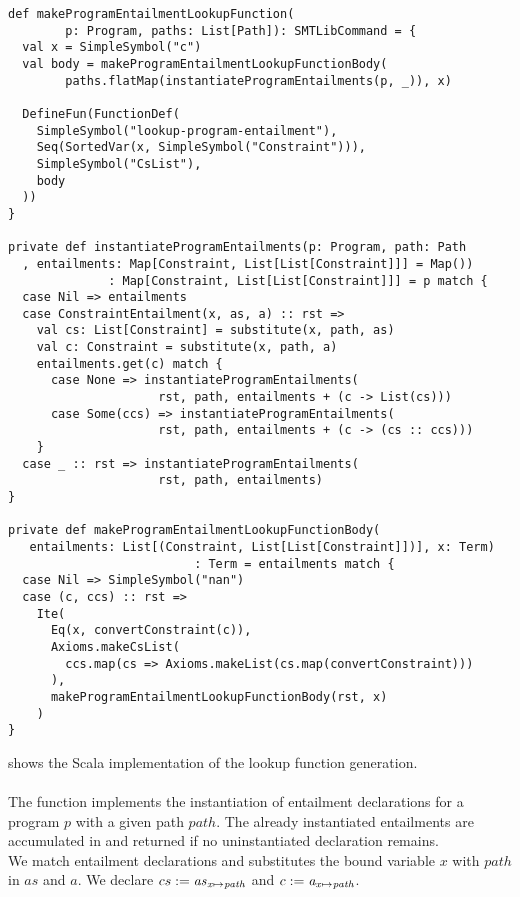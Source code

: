 \begin{lstlisting}[caption={Lookup Function Generation},label=lst:lookup,captionpos=b,frame={lines}]
def makeProgramEntailmentLookupFunction(
        p: Program, paths: List[Path]): SMTLibCommand = {
  val x = SimpleSymbol("c")
  val body = makeProgramEntailmentLookupFunctionBody(
        paths.flatMap(instantiateProgramEntailments(p, _)), x)

  DefineFun(FunctionDef(
    SimpleSymbol("lookup-program-entailment"),
    Seq(SortedVar(x, SimpleSymbol("Constraint"))),
    SimpleSymbol("CsList"),
    body
  ))
}

private def instantiateProgramEntailments(p: Program, path: Path
  , entailments: Map[Constraint, List[List[Constraint]]] = Map())
              : Map[Constraint, List[List[Constraint]]] = p match {
  case Nil => entailments
  case ConstraintEntailment(x, as, a) :: rst =>
    val cs: List[Constraint] = substitute(x, path, as)
    val c: Constraint = substitute(x, path, a)
    entailments.get(c) match {
      case None => instantiateProgramEntailments(
                     rst, path, entailments + (c -> List(cs)))
      case Some(ccs) => instantiateProgramEntailments(
                     rst, path, entailments + (c -> (cs :: ccs)))
    }
  case _ :: rst => instantiateProgramEntailments(
                     rst, path, entailments)
}

private def makeProgramEntailmentLookupFunctionBody(
   entailments: List[(Constraint, List[List[Constraint]])], x: Term)
                          : Term = entailments match {
  case Nil => SimpleSymbol("nan")
  case (c, ccs) :: rst =>
    Ite(
      Eq(x, convertConstraint(c)),
      Axioms.makeCsList(
        ccs.map(cs => Axioms.makeList(cs.map(convertConstraint)))
      ),
      makeProgramEntailmentLookupFunctionBody(rst, x)
    )
}
\end{lstlisting}
%
 shows the Scala implementation
of the lookup function generation.\\
\\
The function 
implements the instantiation of entailment declarations
for a program $p$ with a given path $path$.
The already instantiated entailments are accumulated
in 
and returned if no uninstantiated declaration remains.\\
%
We match entailment declarations 
and substitutes the bound variable $x$ with $path$ in $as$ and $a$.
We declare $cs := \mathit{as}_{\mathit{x} \mapsto \mathit{path}}$ and $c := \mathit{a}_{\mathit{x} \mapsto \mathit{path}}$.
